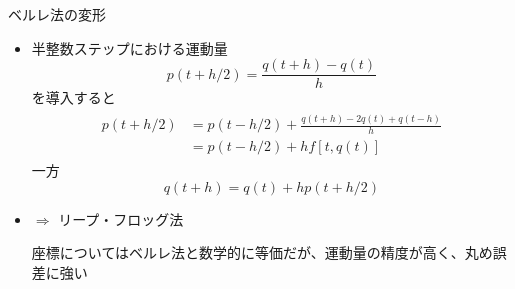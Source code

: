 \begin{frame}[t,fragile]{ベルレ法の変形}
  \begin{itemize}
  \item 半整数ステップにおける運動量
    \[
    p(t + h/2) = \frac{q(t+h)-q(t)}{h}
    \]
    を導入すると
    \begin{align*}
      \begin{split}
        p(t + h/2) &= p(t - h/2) + \frac{q(t+h)-2q(t)+q(t-h)}{h} \\
        &= p(t - h/2) + h f[t,q(t)]
      \end{split}
    \end{align*}
    一方
    \[
    q(t+h) = q(t) + hp(t+h/2)
    \]
  \item $\Rightarrow$ リープ・フロッグ法

    座標についてはベルレ法と数学的に等価だが、運動量の精度が高く、丸め誤差に強い
  \end{itemize}
\end{frame}
